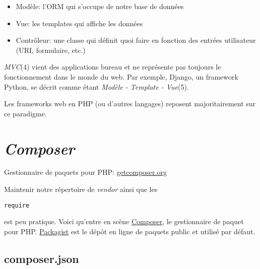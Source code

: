 \begin{itemize}
\tightlist
\item
  Modèle: l'ORM qui s'occupe de notre base de données
\item
  Vue: les templates qui affiche les données
\item
  Contrôleur: une classe qui définit quoi faire en fonction des entrées
  utilisateur (URI, formulaire, etc.)
\end{itemize}

\emph{MVC}(4) vient des applications bureau et ne représente pas
toujours le fonctionnement dans le monde du web. Par exemple, Django, un
framework Python, se décrit comme étant \emph{Modèle - Template -
Vue}(5).

Les frameworks web en PHP (ou d'autres langages) reposent
majoritairement sur ce paradigme.

\hypertarget{composer}{%
\section{\texorpdfstring{\emph{Composer}}{Composer}}\label{composer}}

Gestionnaire de paquets pour PHP:
\href{http://getcomposer.org/}{getcomposer.org}

Maintenir notre répertoire de \emph{vendor} ainsi que les
\begin{otherlanguage}{english}\texttt{require}\end{otherlanguage} est
peu pratique. Voici qu'entre en scène
\href{http://getcomposer.org/}{Composer}, le gestionnaire de paquet pour
PHP. \href{https://packagist.org/}{Packagist} est le dépôt en ligne de
paquets public et utilisé par défaut.

\hypertarget{composer.json}{%
\subsection{composer.json}\label{composer.json}}

\begin{otherlanguage}{english}

\begin{Shaded}
\begin{Highlighting}[]
\FunctionTok{\{}
    \FunctionTok{:} \FunctionTok{\{}
        \FunctionTok{:} \FunctionTok{,}
        \FunctionTok{:} \FunctionTok{,}
    \FunctionTok{\}}
\FunctionTok{\}}
\end{Highlighting}
\end{Shaded}

\end{otherlanguage}

